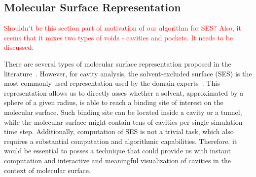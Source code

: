 \subsection{Molecular Surface Representation}
\textcolor{red}{Shouldn't be this section part of motivation of our algorithm for SES? Also, it seems that it mixes two types of voids - cavities and pockets. It needs to be discussed.}

There are several types of molecular surface representation proposed in the literature~\cite{STAR2015}. 
However, for cavity analysis,  the solvent-excluded surface (SES) is the most commonly used representation used by the domain experts~\cite{todo}. 
This representation allows us to directly asses whether a solvent, approximated by a sphere of a given radius, is able to reach a binding site of interest on the molecular surface. 
Such binding site can be located inside a cavity or a tunnel, while the molecular surface might contain tens of cavities per single simulation time step. 
Additionally, computation of SES is not a trivial task, which also requires a substantial computation and algorithmic capabilities. 
Therefore, it would be essential to posses a technique that could provide us with instant computation and interactive and meaningful visualization of cavities in the context of molecular surface.


